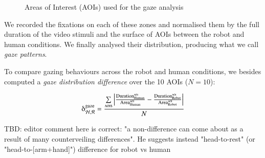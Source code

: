 \documentclass[lettersize, noapacite, twoside, HRI]{apa_HRI}
\begin{document}
\begin{figure}
    \centering

    \caption{Areas of Interest (AOIs) used for the gaze analysis}
    \label{fig:aoi}
\end{figure}

We recorded the fixations on each of these zones and normalised them by
the full duration of the video stimuli and the surface of AOIs between the robot
and human conditions. We finally analysed their distribution, producing what we call \emph{gaze
patterns}.

To compare gazing behaviours across the robot and human conditions, we besides
computed a \emph{gaze distribution difference} over the 10 AOIs ($N=10$):

{\Large
\[
    \delta_{\mathcal{H}, \mathcal{R}}^{\text{gaze}} =
    \frac{\sum\limits_{{\text{{\sc aoi}s}}}\left |
    \frac{\text{Duration}_{\text{Human}}^{\text{\sc
aoi}}}{\text{Area}_{\text{Human}}^{\text{\sc aoi}}} -
\frac{\text{Duration}_{\text{Robot}}^{\text{\sc
aoi}}}{\text{Area}_{\text{Robot}}^{\text{\sc aoi}}} \right |}{N}
\]
}

TBD: editor comment here is correct: "a non-difference can come about as a
result of many counterveiling differences". He suggests instead "head-to-rest"
(or "head-to-[arm+hand]") difference for robot vs human
\end{document}
